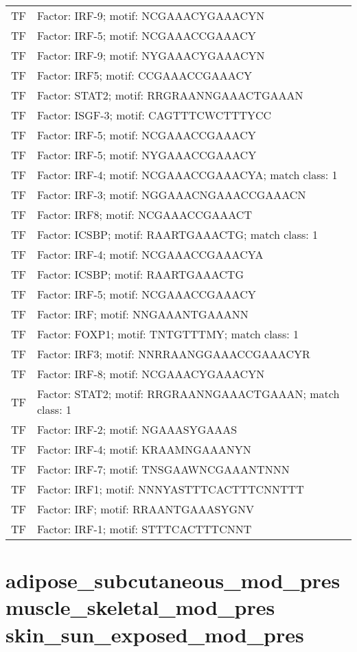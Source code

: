\begin{longtable}{ll}
TF & Factor: IRF-9; motif: NCGAAACYGAAACYN\\
TF & Factor: IRF-5; motif: NCGAAACCGAAACY\\
TF & Factor: IRF-9; motif: NYGAAACYGAAACYN\\
TF & Factor: IRF5; motif: CCGAAACCGAAACY\\
TF & Factor: STAT2; motif: RRGRAANNGAAACTGAAAN\\
TF & Factor: ISGF-3; motif: CAGTTTCWCTTTYCC\\
TF & Factor: IRF-5; motif: NCGAAACCGAAACY\\
TF & Factor: IRF-5; motif: NYGAAACCGAAACY\\
TF & Factor: IRF-4; motif: NCGAAACCGAAACYA; match class: 1\\
TF & Factor: IRF-3; motif: NGGAAACNGAAACCGAAACN\\
TF & Factor: IRF8; motif: NCGAAACCGAAACT\\
TF & Factor: ICSBP; motif: RAARTGAAACTG; match class: 1\\
TF & Factor: IRF-4; motif: NCGAAACCGAAACYA\\
TF & Factor: ICSBP; motif: RAARTGAAACTG\\
TF & Factor: IRF-5; motif: NCGAAACCGAAACY\\
TF & Factor: IRF; motif: NNGAAANTGAAANN\\
TF & Factor: FOXP1; motif: TNTGTTTMY; match class: 1\\
TF & Factor: IRF3; motif: NNRRAANGGAAACCGAAACYR\\
TF & Factor: IRF-8; motif: NCGAAACYGAAACYN\\
TF & Factor: STAT2; motif: RRGRAANNGAAACTGAAAN; match class: 1\\
TF & Factor: IRF-2; motif: NGAAASYGAAAS\\
TF & Factor: IRF-4; motif: KRAAMNGAAANYN\\
TF & Factor: IRF-7; motif: TNSGAAWNCGAAANTNNN\\
TF & Factor: IRF1; motif: NNNYASTTTCACTTTCNNTTT\\
TF & Factor: IRF; motif: RRAANTGAAASYGNV\\
TF & Factor: IRF-1; motif: STTTCACTTTCNNT\\
\bottomrule
\end{longtable}

\section*{adipose\_subcutaneous\_mod\_pres \newline muscle\_skeletal\_mod\_pres \newline skin\_sun\_exposed\_mod\_pres}

